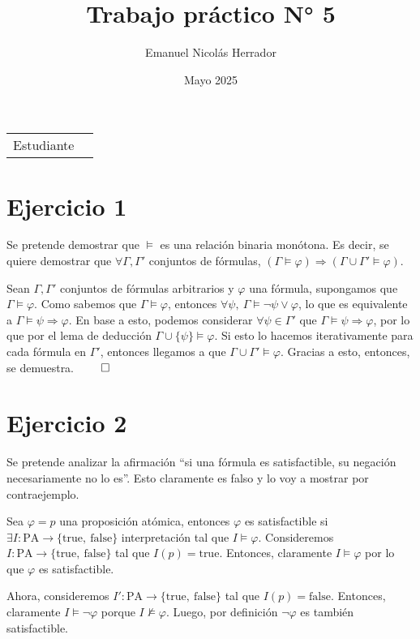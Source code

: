 \documentclass{article}
\title{Trabajo práctico N° 5}
\author{Emanuel Nicolás Herrador}
\date{Mayo 2025}
\begin{document}
\maketitle

\noindent\begin{tabular}{@{}ll}
	Estudiante & \theauthor \\
\end{tabular}

\section*{Ejercicio 1}
Se pretende demostrar que $\vDash$ es una relación binaria monótona.
Es decir, se quiere demostrar que $\forall \Gamma, \Gamma'$ conjuntos de fórmulas, $(\Gamma \vDash \varphi) \Rightarrow (\Gamma \cup \Gamma' \vDash \varphi)$.

Sean $\Gamma, \Gamma'$ conjuntos de fórmulas arbitrarios y $\varphi$ una fórmula, supongamos que $\Gamma \vDash \varphi$.
Como sabemos que $\Gamma \vDash \varphi$, entonces $\forall \psi,\ \Gamma \vDash \neg\psi \lor \varphi$, lo que es equivalente a $\Gamma \vDash \psi \Rightarrow \varphi$.
En base a esto, podemos considerar $\forall \psi \in \Gamma'$ que $\Gamma \vDash \psi \Rightarrow \varphi$, por lo que por el lema de deducción $\Gamma \cup \{\psi\} \vDash \varphi$.
Si esto lo hacemos iterativamente para cada fórmula en $\Gamma'$, entonces llegamos a que $\Gamma \cup \Gamma' \vDash \varphi$.
Gracias a esto, entonces, se demuestra. $\qed$

\section*{Ejercicio 2}
Se pretende analizar la afirmación ``si una fórmula es satisfactible, su negación necesariamente no lo es''.
Esto claramente es falso y lo voy a mostrar por contraejemplo.

Sea $\varphi = p$ una proposición atómica, entonces $\varphi$ es satisfactible si $\exists I:\text{PA}\to\{\text{true},\ \text{false}\}$ interpretación tal que $I \vDash \varphi$.
Consideremos $I:\text{PA}\to\{\text{true},\ \text{false}\}$ tal que $I(p) = \text{true}$.
Entonces, claramente $I \vDash \varphi$ por lo que $\varphi$ es satisfactible.

Ahora, consideremos $I':\text{PA}\to\{\text{true},\ \text{false}\}$ tal que $I(p) = \text{false}$.
Entonces, claramente $I \vDash \neg\varphi$ porque $I \not\vDash \varphi$.
Luego, por definición $\neg\varphi$ es también satisfactible.
\end{document}
